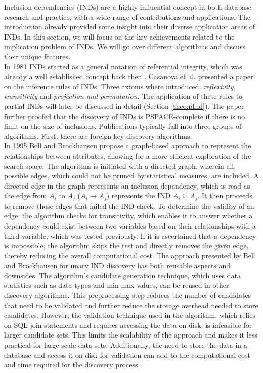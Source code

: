 
Inclusion dependencies (INDs) are a highly influential concept in both database research and practice, with a wide range of contributions and applications. The introduction already provided some insight into their diverse application areas of INDs. In this section, we will focus on the key achievements related to the implication problem of INDs. We will go over different algorithms and discuss their unique features. \\

In 1981 INDs started as a general notation of referential integrity, which was already a well established concept back then \cite{date1981referential}. Casanova et al. presented a paper \cite{casanova1982inclusion} on the inference rules of INDs. Three axioms where introduced: \textit{reflexivity}, \textit{transitivity} and \textit{projection and permutation}. The application of these rules to partial INDs will later be discussed in detail (Section \ref{theo:pInd}). The paper further proofed that the discovery of INDs is PSPACE-complete if there is no limit on the size of inclusions. Publications typically fall into three groups of algorithms. First, there are foreign key discovery algorithms. \\

In 1995 Bell and Brockhausen \cite{bell1995discovery} propose a graph-based approach to represent the relationships between attributes, allowing for a more efficient exploration of the search space. The algorithm is initiated with a directed graph, wherein all possible edges, which could not be pruned by statistical measures, are included. A directed edge in the graph represents an inclusion dependency, which is read as the edge from $A_i$ to $A_j$ ($A_i \rightarrow A_j$) represents the IND $A_i \subseteq A_j$. It then proceeds to remove those edges that failed the IND check. To determine the validity of an edge, the algorithm checks for transitivity, which enables it to answer whether a dependency could exist between two variables based on their relationships with a third variable, which was tested previously. If it is ascertained that a dependency is impossible, the algorithm skips the test and directly removes the given edge, thereby reducing the overall computational cost. The approach presented by Bell and Brockhausen for unary IND discovery has both reusable aspects and downsides. The algorithm's candidate generation technique, which uses data statistics such as data types and min-max values, can be reused in other discovery algorithms. This preprocessing step reduces the number of candidates that need to be validated and further reduce the storage overhead needed to store candidates. However, the validation technique used in the algorithm, which relies on SQL join-statements and requires accessing the data on disk, is infeasible for larger candidate sets. This limits the scalability of the approach and makes it less practical for large-scale data sets. Additionally, the need to store the data in a database and access it on disk for validation can add to the computational cost and time required for the discovery process. \\

